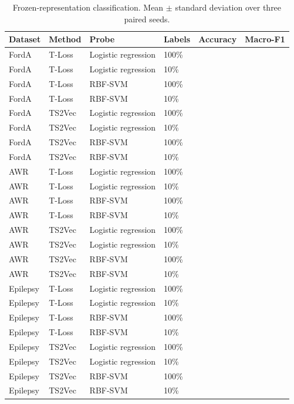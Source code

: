 \documentclass[a4paper,11pt]{article}
\begin{document}
\begin{table}[h]
    \centering
    \small
    \begin{tabular}{l l l l c c}
        \toprule
        Dataset & Method & Probe & Labels & Accuracy & Macro-F1 \\
        \midrule
        FordA & T-Loss & Logistic regression & 100\% & & \\
        FordA & T-Loss & Logistic regression & 10\%  & & \\
        FordA & T-Loss & RBF-SVM             & 100\% & & \\
        FordA & T-Loss & RBF-SVM             & 10\%  & & \\
        FordA & TS2Vec & Logistic regression & 100\% & & \\
        FordA & TS2Vec & Logistic regression & 10\%  & & \\
        FordA & TS2Vec & RBF-SVM             & 100\% & & \\
        FordA & TS2Vec & RBF-SVM             & 10\%  & & \\
        \midrule
        AWR & T-Loss & Logistic regression & 100\% & & \\
        AWR & T-Loss & Logistic regression & 10\%  & & \\
        AWR & T-Loss & RBF-SVM             & 100\% & & \\
        AWR & T-Loss & RBF-SVM             & 10\%  & & \\
        AWR & TS2Vec & Logistic regression & 100\% & & \\
        AWR & TS2Vec & Logistic regression & 10\%  & & \\
        AWR & TS2Vec & RBF-SVM             & 100\% & & \\
        AWR & TS2Vec & RBF-SVM             & 10\%  & & \\
        \midrule
        Epilepsy & T-Loss & Logistic regression & 100\% & & \\
        Epilepsy & T-Loss & Logistic regression & 10\%  & & \\
        Epilepsy & T-Loss & RBF-SVM             & 100\% & & \\
        Epilepsy & T-Loss & RBF-SVM             & 10\%  & & \\
        Epilepsy & TS2Vec & Logistic regression & 100\% & & \\
        Epilepsy & TS2Vec & Logistic regression & 10\%  & & \\
        Epilepsy & TS2Vec & RBF-SVM             & 100\% & & \\
        Epilepsy & TS2Vec & RBF-SVM             & 10\%  & & \\
        \bottomrule
    \end{tabular}
    \caption{Frozen-representation classification. Mean $\pm$ standard deviation over three paired seeds.}
    \label{tab:ssl-clean}
\end{table}
\end{document}
